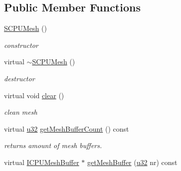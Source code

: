 \subsection*{Public Member Functions}
\begin{DoxyCompactItemize}
\item 
\hyperlink{classirr_1_1scene_1_1SCPUMesh_ab969097726b6a4f336d3d08069bfa73f}{S\+C\+P\+U\+Mesh} ()\hypertarget{classirr_1_1scene_1_1SCPUMesh_ab969097726b6a4f336d3d08069bfa73f}{}\label{classirr_1_1scene_1_1SCPUMesh_ab969097726b6a4f336d3d08069bfa73f}

\begin{DoxyCompactList}\small\item\em constructor \end{DoxyCompactList}\item 
virtual \hyperlink{classirr_1_1scene_1_1SCPUMesh_a33d7fd3d103b5071bdf8961c55acebe4}{$\sim$\+S\+C\+P\+U\+Mesh} ()\hypertarget{classirr_1_1scene_1_1SCPUMesh_a33d7fd3d103b5071bdf8961c55acebe4}{}\label{classirr_1_1scene_1_1SCPUMesh_a33d7fd3d103b5071bdf8961c55acebe4}

\begin{DoxyCompactList}\small\item\em destructor \end{DoxyCompactList}\item 
virtual void \hyperlink{classirr_1_1scene_1_1SCPUMesh_aa9c89cd2981701f20863baa6b1d52f78}{clear} ()\hypertarget{classirr_1_1scene_1_1SCPUMesh_aa9c89cd2981701f20863baa6b1d52f78}{}\label{classirr_1_1scene_1_1SCPUMesh_aa9c89cd2981701f20863baa6b1d52f78}

\begin{DoxyCompactList}\small\item\em clean mesh \end{DoxyCompactList}\item 
virtual \hyperlink{namespaceirr_a0416a53257075833e7002efd0a18e804}{u32} \hyperlink{classirr_1_1scene_1_1SCPUMesh_a779211c91a74cb292ffc6992e228799d}{get\+Mesh\+Buffer\+Count} () const \hypertarget{classirr_1_1scene_1_1SCPUMesh_a779211c91a74cb292ffc6992e228799d}{}\label{classirr_1_1scene_1_1SCPUMesh_a779211c91a74cb292ffc6992e228799d}

\begin{DoxyCompactList}\small\item\em returns amount of mesh buffers. \end{DoxyCompactList}\item 
virtual \hyperlink{classirr_1_1scene_1_1ICPUMeshBuffer}{I\+C\+P\+U\+Mesh\+Buffer} $\ast$ \hyperlink{classirr_1_1scene_1_1SCPUMesh_aceebdb00f6de1a5ec9564930c1a55a6e}{get\+Mesh\+Buffer} (\hyperlink{namespaceirr_a0416a53257075833e7002efd0a18e804}{u32} nr) const \hypertarget{classirr_1_1scene_1_1SCPUMesh_aceebdb00f6de1a5ec9564930c1a55a6e}{}\label{classirr_1_1scene_1_1SCPUMesh_aceebdb00f6de1a5ec9564930c1a55a6e}


\end{DoxyCompactItemize}
